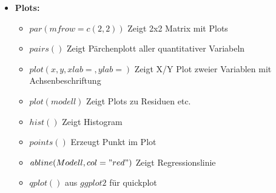 \documentclass[a4paper]{article}
\begin{document}
\begin{landscape}
\begin{multicols}{3}
\begin{itemize} [noitemsep,nolistsep,leftmargin=*]
            \item \textbf{Plots:}
            \begin{itemize}[noitemsep,nolistsep,leftmargin=*]
                \item $par(mfrow = c(2, 2))$ Zeigt 2x2 Matrix mit Plots
                \item $pairs()$ Zeigt Pärchenplott aller quantitativer Variabeln
                \item $plot(x,y, xlab=, ylab=)$ Zeigt X/Y Plot zweier Variablen mit Achsenbeschriftung
                \item $plot(modell)$ Zeigt Plots zu Residuen etc.
                \item $hist()$ Zeigt Histogram
                \item $points()$ Erzeugt Punkt im Plot
                \item $abline(Modell, col="red")$ Zeigt Regressionslinie
                \item $qplot()$ aus $ggplot2$ für quickplot
            \end{itemize}
        \end{itemize}
    
    \end{multicols}
    
\end{landscape}
\end{document}
